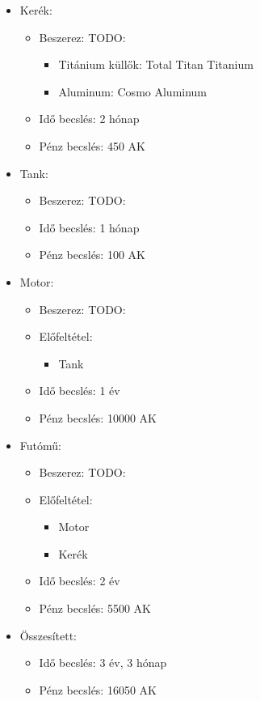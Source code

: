 \documentclass[12pt]{report}
\begin{document}
\begin{itemize}
    \item Kerék:
        \begin{itemize}
            \item Beszerez: TODO: 
                \begin{itemize}
                    \item Titánium küllők: Total Titan Titanium
                    \item Aluminum: Cosmo Aluminum
                \end{itemize}
            \item Idő becslés: 2 hónap
            \item Pénz becslés: 450 AK
        \end{itemize}
    \item Tank:
        \begin{itemize}
            \item Beszerez: TODO: 
            \item Idő becslés: 1 hónap
            \item Pénz becslés: 100 AK
        \end{itemize}
    \item Motor:
        \begin{itemize}
            \item Beszerez: TODO: 
            \item Előfeltétel: 
                \begin{itemize}
                    \item Tank
                \end{itemize}
            \item Idő becslés: 1 év
            \item Pénz becslés: 10000 AK
        \end{itemize}
    \item Futómű:
        \begin{itemize}
            \item Beszerez: TODO: 
            \item Előfeltétel: 
                \begin{itemize}
                    \item Motor
                    \item Kerék
                \end{itemize}
            \item Idő becslés: 2 év
            \item Pénz becslés: 5500 AK
        \end{itemize}
    \item Összesített:
        \begin{itemize}
            \item Idő becslés: 3 év, 3 hónap
            \item Pénz becslés: 16050 AK
        \end{itemize}
\end{itemize}
\end{document}
